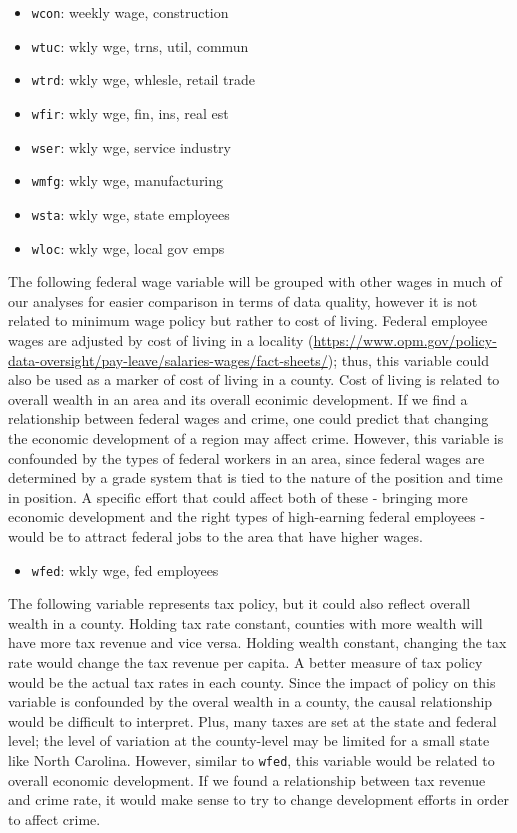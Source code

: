 \documentclass[]{article}
\providecommand{\tightlist}{%
  \setlength{\itemsep}{0pt}\setlength{\parskip}{0pt}}
\begin{document}
\begin{itemize}
\tightlist
\item
  \texttt{wcon}: weekly wage, construction
\item
  \texttt{wtuc}: wkly wge, trns, util, commun
\item
  \texttt{wtrd}: wkly wge, whlesle, retail trade
\item
  \texttt{wfir}: wkly wge, fin, ins, real est
\item
  \texttt{wser}: wkly wge, service industry
\item
  \texttt{wmfg}: wkly wge, manufacturing
\item
  \texttt{wsta}: wkly wge, state employees
\item
  \texttt{wloc}: wkly wge, local gov emps
\end{itemize}

The following federal wage variable will be grouped with other wages in
much of our analyses for easier comparison in terms of data quality,
however it is not related to minimum wage policy but rather to cost of
living. Federal employee wages are adjusted by cost of living in a
locality
(\url{https://www.opm.gov/policy-data-oversight/pay-leave/salaries-wages/fact-sheets/});
thus, this variable could also be used as a marker of cost of living in
a county. Cost of living is related to overall wealth in an area and its
overall econimic development. If we find a relationship between federal
wages and crime, one could predict that changing the economic
development of a region may affect crime. However, this variable is
confounded by the types of federal workers in an area, since federal
wages are determined by a grade system that is tied to the nature of the
position and time in position. A specific effort that could affect both
of these - bringing more economic development and the right types of
high-earning federal employees - would be to attract federal jobs to the
area that have higher wages.

\begin{itemize}
\tightlist
\item
  \texttt{wfed}: wkly wge, fed employees
\end{itemize}

The following variable represents tax policy, but it could also reflect
overall wealth in a county. Holding tax rate constant, counties with
more wealth will have more tax revenue and vice versa. Holding wealth
constant, changing the tax rate would change the tax revenue per capita.
A better measure of tax policy would be the actual tax rates in each
county. Since the impact of policy on this variable is confounded by the
overal wealth in a county, the causal relationship would be difficult to
interpret. Plus, many taxes are set at the state and federal level; the
level of variation at the county-level may be limited for a small state
like North Carolina. However, similar to \texttt{wfed}, this variable
would be related to overall economic development. If we found a
relationship between tax revenue and crime rate, it would make sense to
try to change development efforts in order to affect crime.
\end{document}
